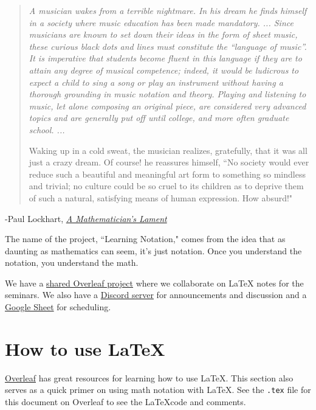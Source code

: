 \documentclass{article}[12pt]
\begin{document}
        \begin{quote}
            \it
            A musician wakes from a terrible nightmare. In his dream he finds himself in a society where music education has been made mandatory. ... Since musicians are known to set down their ideas in the form of sheet music, these curious black dots and lines must constitute the “language of music”. It is imperative that students become fluent in this language if they are to attain any degree of musical competence; indeed, it would be ludicrous to expect a child to sing a song or play an instrument without having a thorough grounding in music notation and theory. Playing and listening to music, let alone composing an original piece, are considered very advanced topics and are generally put off until college, and more often graduate school. ...
            
            Waking up in a cold sweat, the musician realizes, gratefully, that it was all just a crazy dream. Of course! he reassures himself, ``No society would ever reduce such a beautiful and meaningful art form to something so mindless and trivial; no culture could be so cruel to its children as to deprive them of such a natural, satisfying means of human expression. How absurd!"
        \end{quote}
        \hfill -Paul Lockhart, \href{https://www.maa.org/external_archive/devlin/LockhartsLament.pdf}{\it A Mathematician's Lament}
        
        The name of the project, ``Learning Notation," comes from the idea that as daunting as mathematics can seem, it's just notation. Once you understand the notation, you understand the math.
        
        We have a \href{https://www.overleaf.com/4797466783cszvmfmgsbct}{shared Overleaf project} where we collaborate on \LaTeX{} notes for the seminars. We also have a \href{https://discord.gg/Atv2jfRZnx}{Discord server} for announcements and discussion and a \href{https://docs.google.com/spreadsheets/d/1Ge9dVUt8bkdbZr03XvqzWJXrUtmdrix6Oo6ylrGNNsM/edit?usp=sharing}{Google Sheet} for scheduling.
    
    
    \section*{How to use \LaTeX{}}
        
        \href{https://www.overleaf.com/learn/latex/Learn_LaTeX_in_30_minutes}{Overleaf} has great resources for learning how to use \LaTeX. This section also serves as a quick primer on using math notation with \LaTeX. See the \texttt{.tex} file for this document on Overleaf to see the \LaTeX code and comments. %
    
\end{document}
